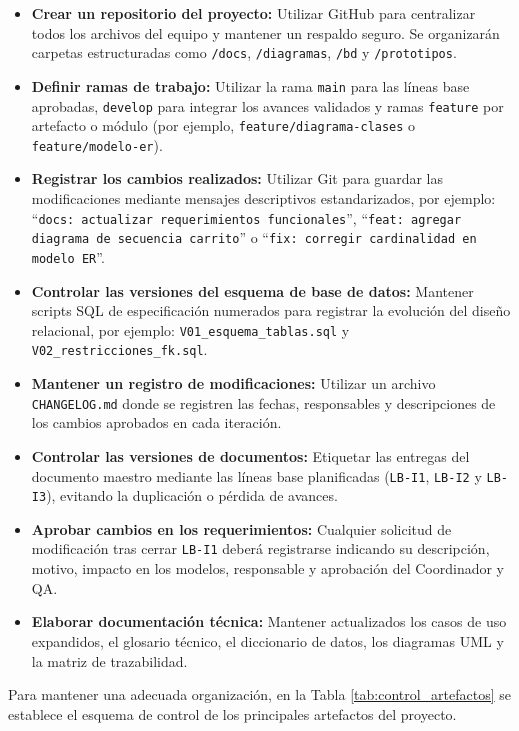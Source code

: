 \begin{itemize}
    \item \textbf{Crear un repositorio del proyecto:} Utilizar GitHub para centralizar todos los archivos del equipo y mantener un respaldo seguro. Se organizarán carpetas estructuradas como \texttt{/docs}, \texttt{/diagramas}, \texttt{/bd} y \texttt{/prototipos}.
    \item \textbf{Definir ramas de trabajo:} Utilizar la rama \texttt{main} para las líneas base aprobadas, \texttt{develop} para integrar los avances validados y ramas \texttt{feature} por artefacto o módulo (por ejemplo, \texttt{feature/diagrama-clases} o \texttt{feature/modelo-er}).
    \item \textbf{Registrar los cambios realizados:} Utilizar Git para guardar las modificaciones mediante mensajes descriptivos estandarizados, por ejemplo: ``\texttt{docs: actualizar requerimientos funcionales}'', ``\texttt{feat: agregar diagrama de secuencia carrito}'' o ``\texttt{fix: corregir cardinalidad en modelo ER}''.
    \item \textbf{Controlar las versiones del esquema de base de datos:} Mantener scripts SQL de especificación numerados para registrar la evolución del diseño relacional, por ejemplo: \texttt{V01\_esquema\_tablas.sql} y \texttt{V02\_restricciones\_fk.sql}.
    \item \textbf{Mantener un registro de modificaciones:} Utilizar un archivo \texttt{CHANGELOG.md} donde se registren las fechas, responsables y descripciones de los cambios aprobados en cada iteración.
    \item \textbf{Controlar las versiones de documentos:} Etiquetar las entregas del documento maestro mediante las líneas base planificadas (\texttt{LB-I1}, \texttt{LB-I2} y \texttt{LB-I3}), evitando la duplicación o pérdida de avances.
    \item \textbf{Aprobar cambios en los requerimientos:} Cualquier solicitud de modificación tras cerrar \texttt{LB-I1} deberá registrarse indicando su descripción, motivo, impacto en los modelos, responsable y aprobación del Coordinador y QA.
    \item \textbf{Elaborar documentación técnica:} Mantener actualizados los casos de uso expandidos, el glosario técnico, el diccionario de datos, los diagramas UML y la matriz de trazabilidad.
\end{itemize}

Para mantener una adecuada organización, en la Tabla \ref{tab:control_artefactos} se establece el esquema de control de los principales artefactos del proyecto.

